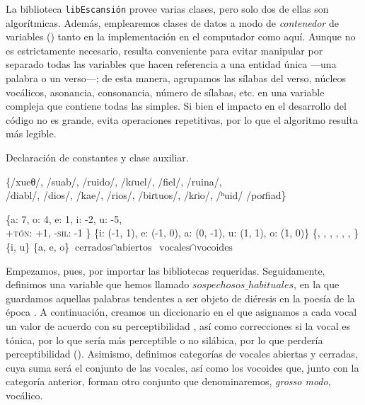 La biblioteca \texttt{libEscansión} provee varias clases, pero solo dos de ellas son algorítmicas. Además, emplearemos clases de datos a modo de \textit{contenedor} de variables () tanto en la implementación en el computador como aquí. Aunque no es estrictamente necesario, resulta conveniente para evitar manipular por separado todas las variables que hacen referencia a una entidad única —una palabra o un verso—; de esta manera, agrupamos las sílabas del verso, núcleos vocálicos, asonancia, consonancia, número de sílabas, etc. en una variable compleja que contiene todas las simples. Si bien el impacto en el desarrollo del código no es grande, evita operaciones repetitivas, por lo que el algoritmo resulta más legible. 
	
	\begin{algorithm}[!ht] %
		\caption{Declaración de constantes y clase auxiliar.}\label{list:Features}
		\;\;

		\sospechosos \gets \{/xueθ/, /suab/, /ruido/, /kɾuel/, /fiel/, /ruina/,\\ \Indp /diabl/, /dios/, /kae/, /rios/, /biɾtuos/, /kɾio/, /ʰuid/ /poɾfiad\} \;\Indm

		\perceptibilidad \gets \{\textlangle a\textrangle: 7, \textlangle o\textrangle: 4, \textlangle e\textrangle: 1, \textlangle i\textrangle: -2, \textlangle u\textrangle: -5, \\ \Indp\textlangle+\textsc{tón}\textrangle: +1, \textlangle-\textsc{sil}\textrangle: -1 \} \;\Indm 
		\trapecio \gets \{\textlangle i\textrangle: (-1, 1), \textlangle e\textrangle: (-1, 0), \textlangle a\textrangle: (0, -1), \textlangle u\textrangle: (1, 1), \textlangle o\textrangle: (1, 0)\}\;
		\vocoides \gets \{, , ,
		,
		,
		,
		\} \;
		\cerradas \gets \{\textlangle i\textrangle, \textlangle u\textrangle\} \;
		\abiertas \gets \{\textlangle a\textrangle, \textlangle e\textrangle,  \textlangle o\textrangle\} \;
		\vocales \gets $\text{cerrados} \cap \text{abiertos}$ \;
		\vocalicos \gets $\text{vocales} \cap \text{vocoides}$ 
		\end{algorithm}
	
Empezamos, pues, por importar las bibliotecas requeridas. Seguidamente, definimos una variable que hemos llamado $sospechosos\_habituales$, en la que guardamos aquellas palabras tendentes a ser objeto de diéresis en la poesía de la época \parencite[55-64]{llamas2020}. A continuación, creamos un diccionario en el que asignamos a cada vocal un valor de acuerdo con su perceptibilidad \parencite[25]{navarrotomas2004}, así como correcciones si la vocal es tónica, por lo que sería más perceptible o no silábica, por lo que perdería perceptibilidad (). Asimismo, definimos categorías de vocales abiertas y cerradas, cuya suma será el conjunto de las vocales, así como los vocoides que, junto con la categoría anterior, forman otro conjunto que denominaremos, \textit{grosso modo}, vocálico. 

